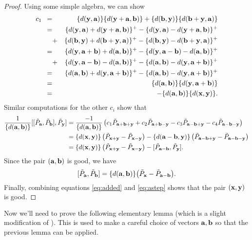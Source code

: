 \begin{proof}
Using some simple algebra, we can show
	\begin{eqnarray*}
c_1 \,\,\, =& &  \{d(\yy,\aab)\} \{d(\yy+\aab,\bb)\} + \{d(\bb,\yy)\} \{d(\bb+\yy,\aab)\} \\
=&& \{d(\yy,\aab)+d(\yy+\aab,\bb)\}^+ - \{d(\yy,\aab)-d(\yy+\aab,\bb)\}^+ \\
&+& \{d(\bb,\yy)+d(\bb+\yy,\aab)\}^+ - \{d(\bb,\yy)-d(\bb+\yy,\aab)\}^+  \\
=&& \{d(\yy,\aab+\bb)+d(\aab,\bb)\}^+ - \{d(\yy,\aab-\bb)-d(\aab,\bb)\}^+ \\
&+& \{d(\yy,\aab-\bb)-d(\aab,\bb)\}^+ - \{d(\aab,\bb)-d(\yy,\aab+\bb)\}^+ \\
=&& \{d(\aab,\bb)+d(\yy,\aab+\bb)\}^+ - \{d(\aab,\bb)-d(\yy,\aab+\bb)\}^+ \\
=&& \{d(\aab,\bb)\} \{d(\yy,\aab+\bb)\} \\
=&& - \{d(\aab,\bb)\} \{d(\xx,\yy)\}.
	\end{eqnarray*}
Similar computations for the other $c_i$ show that 
	\begin{align}
\frac{1}{\{d(\aab,\bb)\}}[[\tilde{P}_\aab,\tilde{P}_\bb],\tilde{P}_\yy] &=  \frac{-1}{\{d(\aab,\bb)\}} \left( c_1 \tilde{P}_{\aab+\bb+\yy} + c_2 \tilde{P}_{\aab+\bb-\yy} - c_3 \tilde{P}_{\aab-\bb+\yy} - c_4 \tilde{P}_{\aab-\bb-\yy}\right) \notag\\ 
&=  \{d(\xx,\yy)\} \left( \tilde{P}_{\xx+\yy} - \tilde{P}_{\xx-\yy} \right) 
-\{d(\aab-\bb,\yy)\} \left( \tilde{P}_{\aab-\bb+\yy} - \tilde{P}_{\aab-\bb-\yy} \right)\notag \\
&= \{d(\xx,\yy)\} \left( \tilde{P}_{\xx+\yy} - \tilde{P}_{\xx-\yy} \right) 
- [\tilde{P}_{\aab-\bb},\tilde{P}_\yy]. \label{eq:astep}
	\end{align}
	Since the pair $(\aab,\bb)$ is good, we have 
\begin{equation}\label{eq:added}
[\tilde{P}_{\aab}, \tilde{P}_{\bb}] = \{d(\aab, \bb )\} \big( \tilde{P}_{\xx} - \tilde{P}_{\aab-\bb} \big).
\end{equation}
Finally, combining equations \eqref{eq:added} and \eqref{eq:astep} shows that the pair $(\xx,\yy)$ is good.
\end{proof}

Now we'll need to prove the following elementary lemma (which is a slight modification of \cite[Lemma 1]{FG00} ). This is used to make a careful choice of vectors $\aab, \bb$ so that the previous lemma can be applied. 

